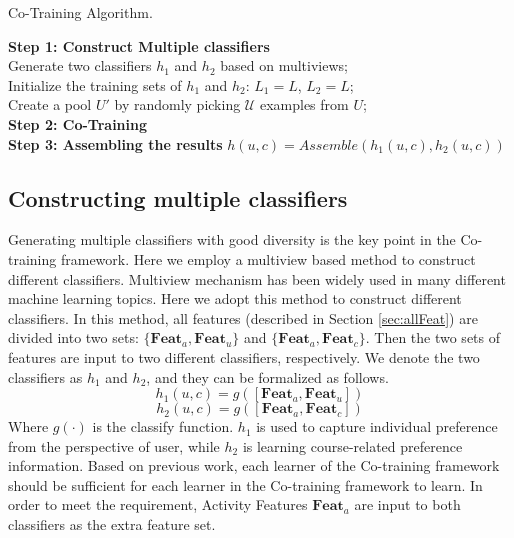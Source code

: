 	\begin{algorithm}[!h]
		\caption{Co-Training Algorithm.}  
		\label{alg:Co-Training}  
		\textbf{Step 1: Construct Multiple classifiers}\\
		Generate two classifiers $h_1$ and $h_2$ based on multiviews;\\
		Initialize the training sets of $h_1$ and $h_2$: $L_1=L $, $L_2 = L$; \\  
		Create a pool $U'$ by randomly picking $\mathcal{U}$ examples from $U$;\\
		\textbf{Step 2: Co-Training}\\
		\textbf{Step 3: Assembling the results} $h(u,c)=Assemble(h_1(u,c), h_2(u,c))$
	\end{algorithm}

	
	\subsection{Constructing multiple classifiers}
	\label{sec:construct}
	Generating multiple classifiers with good diversity is the key point in the Co-training framework. Here we employ a multiview based method to construct different classifiers. Multiview mechanism has been widely used in many different machine learning topics. Here we adopt this method to construct different classifiers. In this method, all features (described in Section \ref{sec:allFeat})  are divided into two sets: $\{\mathbf{Feat}_a, \mathbf{Feat}_u\}$ and $\{\mathbf{Feat}_a, \mathbf{Feat}_c\}$. Then the two sets of features are input to two different classifiers, respectively. We denote the two classifiers as $h_1$ and $h_2$, and they can be formalized as follows.
	\begin{equation}
	h_1(u,c) = g([\mathbf{Feat}_{a}, \mathbf{Feat}_{u}])\end{equation}
	\begin{equation}h_2(u,c)=g([\mathbf{Feat}_{a}, \mathbf{Feat}_{c}])
	\end{equation}
	Where $g(\cdot)$ is the classify function. $h_1$ is used to capture individual preference from the perspective of user, while $h_2$ is learning course-related preference information. Based on previous work\cite{Zhou:2005:SRC:1642293.1642439}, each learner of the Co-training framework should be sufficient for each learner in the Co-training framework to learn. In order to meet the requirement, Activity Features $\mathbf{Feat}_a$ are input to both classifiers as the extra feature set. 
	
